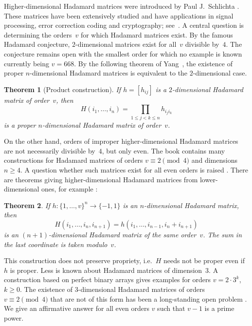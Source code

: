 \documentclass[12pt, reqno]{amsart}
\newtheorem{theorem}{Theorem}[section]
\begin{document}
Higher-dimensional Hadamard matrices were introduced by Paul J.\ Schlichta \cite{PS71, PS79}.
These matrices have been extensively studied and have applications in signal processing,
error correction coding and cryptography; see~\cite{KH07, YNX10}.
A central question is determining the orders~$v$ for which Hadamard matrices
exist. By the famous Hadamard conjecture, $2$-dimensional matrices exist for
all~$v$ divisible by~$4$. The conjecture remains open with the smallest
order for which no example is known currently being $v=668$. By the following
theorem of Yang~\cite{YY86}, the existence of proper $n$-dimensional Hadamard
matrices is equivalent to the $2$-dimensional case.

\begin{theorem}[Product construction]
If $h=[h_{ij}]$ is a $2$-dimensional Hadamard matrix of order~$v$, then
$$H(i_1,\ldots,i_n)=\prod_{1\le j<k\le n} h_{i_j i_k}$$
is a proper $n$-dimensional Hadamard matrix of order~$v$.
\end{theorem}

On the other hand, orders of improper higher-dimensional Hada\-mard
matrices are not necessarily divisible by~$4$, but only even. The book \cite{YNX10}
contains many constructions for Hadamard matrices of orders $v\equiv 2 \pmod{4}$
and dimensions $n\ge 4$. A question whether such matrices exist for all
even orders is raised \cite[Question~12, p.~419]{YNX10}. There are
theorems giving higher-dimensional Hadamard matrices from lower-dimensional
ones, for example \cite[Theorem~6.1.5]{YNX10}:

\begin{theorem}\label{dimpp}
If $h:\{1,\ldots,v\}^n\to\{-1,1\}$ is an $n$-dimensional Hadamard matrix, then
$$H(i_1,\ldots,i_n,i_{n+1})=h(i_1,\ldots,i_{n-1},i_n+i_{n+1})$$
is an $(n+1)$-dimensional Hadamard matrix of the same order~$v$.
The sum in the last coordinate is taken modulo~$v$.
\end{theorem}

This construction does not preserve propriety, i.e.\ $H$ needs not be proper
even if~$h$ is proper. Less is known about Hadamard matrices of dimension~$3$.
A construction based on perfect binary arrays \cite[Theorem~3.2.2]{YNX10} gives
examples for orders $v=2\cdot 3^k$, $k\ge 0$. The existence of $3$-dimensional
Hadamard matrices of orders $v\equiv 2 \pmod{4}$ that are not of this form has
been a long-standing open problem \cite[Questions~5 and~6, p.~419]{YNX10}.
We give an affirmative answer for all even orders $v$ such that $v-1$ is a
prime power.
\end{document}
